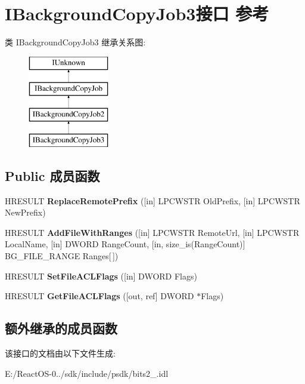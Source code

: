 \hypertarget{interface_i_background_copy_job3}{}\section{I\+Background\+Copy\+Job3接口 参考}
\label{interface_i_background_copy_job3}
类 I\+Background\+Copy\+Job3 继承关系图\+:\begin{figure}[H]
\begin{center}
\leavevmode
\includegraphics[height=4.000000cm]{interface_i_background_copy_job3}
\end{center}
\end{figure}
\subsection*{Public 成员函数}
\begin{DoxyCompactItemize}
\item 
\mbox{\label{interface_i_background_copy_job3_af3e24df46569fe6d1846538556f6e081}} 
H\+R\+E\+S\+U\+LT {\bfseries Replace\+Remote\+Prefix} (\mbox{[}in\mbox{]} L\+P\+C\+W\+S\+TR Old\+Prefix, \mbox{[}in\mbox{]} L\+P\+C\+W\+S\+TR New\+Prefix)
\item 
\mbox{\label{interface_i_background_copy_job3_a6e18d4c437a0c2f65e1251eba4ccd94a}} 
H\+R\+E\+S\+U\+LT {\bfseries Add\+File\+With\+Ranges} (\mbox{[}in\mbox{]} L\+P\+C\+W\+S\+TR Remote\+Url, \mbox{[}in\mbox{]} L\+P\+C\+W\+S\+TR Local\+Name, \mbox{[}in\mbox{]} D\+W\+O\+RD Range\+Count, \mbox{[}in, size\+\_\+is(Range\+Count)\mbox{]} B\+G\+\_\+\+F\+I\+L\+E\+\_\+\+R\+A\+N\+GE Ranges\mbox{[}$\,$\mbox{]})
\item 
\mbox{\label{interface_i_background_copy_job3_adc37887e3e9cb28ac38b9619e09ff73b}} 
H\+R\+E\+S\+U\+LT {\bfseries Set\+File\+A\+C\+L\+Flags} (\mbox{[}in\mbox{]} D\+W\+O\+RD Flags)
\item 
\mbox{\label{interface_i_background_copy_job3_af8952b60943fddeed021415c57300098}} 
H\+R\+E\+S\+U\+LT {\bfseries Get\+File\+A\+C\+L\+Flags} (\mbox{[}out, ref\mbox{]} D\+W\+O\+RD $\ast$Flags)
\end{DoxyCompactItemize}
\subsection*{额外继承的成员函数}


该接口的文档由以下文件生成\+:\begin{DoxyCompactItemize}
\item 
E\+:/\+React\+O\+S-\/0../sdk/include/psdk/bits2\+\_.\+idl\end{DoxyCompactItemize}

